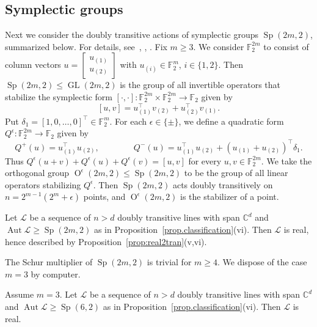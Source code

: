 \subsection{Symplectic groups}
\label{subsec:symplectic}
Next we consider the doubly transitive actions of symplectic groups $\operatorname{Sp}(2m,2)$, summarized below.
For details, see~\cite[Section~7.7]{DixonMortimer:96}, \cite[Chapters 12--14]{Grove:02}, \cite[Chapter~2]{KleidmanLiebeck:90}.
Fix $m \geq 3$.
We consider $\mathbb{F}_2^{2m}$ to consist of column vectors $u = \left[ \begin{array}{c} u_{(1)} \\ u_{(2)} \end{array} \right]$ with $u_{(i)} \in \mathbb{F}_2^m$, $i\in\{1,2\}$.
Then $\operatorname{Sp}(2m,2) \leq \operatorname{GL}(2m,2)$ is the group of all invertible operators that stabilize the symplectic form $[\cdot ,\cdot] \colon \mathbb{F}_2^{2m} \times \mathbb{F}_2^{2m} \to \mathbb{F}_2$ given by
\[ [u,v] = u_{(1)}^\top v_{(2)} + u_{(2)}^\top v_{(1)}. \]
Put $\delta_1 = [1,0,\dotsc,0]^\top \in \mathbb{F}_2^m$.
For each $\epsilon \in \{ \pm \}$, we define a quadratic form $Q^\epsilon \colon \mathbb{F}_2^{2m} \to \mathbb{F}_2$ given by
\[
Q^+(u) = u_{(1)}^\top u_{(2)},
\qquad
\qquad
Q^-(u) = u_{(1)}^\top u_{(2)} + (u_{(1)} + u_{(2)})^\top \delta_1.
\]
Thus $Q^\epsilon(u+v) + Q^\epsilon(u) + Q^\epsilon(v) = [u,v]$ for every $u,v \in \mathbb{F}_2^{2m}$.
We take the orthogonal group $\operatorname{O}^\epsilon(2m,2) \leq \operatorname{Sp}(2m,2)$ to be the group of all linear operators stabilizing $Q^\epsilon$.
Then $\operatorname{Sp}(2m,2)$ acts doubly transitively on $n = 2^{m-1}(2^m + \epsilon)$ points, and $\operatorname{O}^\epsilon(2m,2)$ is the stabilizer of a point.


\begin{theorem}
\label{thm:Sp2m2}
Let $\mathscr{L}$ be a sequence of $n > d$ doubly transitive lines with span $\mathbb{C}^d$ and $\operatorname{Aut} \mathscr{L} \geq \operatorname{Sp}(2m,2)$ as in Proposition~\ref{prop.classification}(vi).
Then $\mathscr{L}$ is real, hence described by Proposition~\ref{prop:real2tran}(v,vi).
\end{theorem}

The Schur multiplier of $\operatorname{Sp}(2m,2)$ is trivial for $m \geq 4$.
We dispose of the case $m=3$ by computer.

\begin{lemma}
Assume $m=3$.
Let $\mathscr{L}$ be a sequence of $n > d$ doubly transitive lines with span $\mathbb{C}^d$ and $\operatorname{Aut} \mathscr{L} \geq \operatorname{Sp}(6,2)$ as in Proposition~\ref{prop.classification}(vi).
Then $\mathscr{L}$ is real.
\end{lemma}

